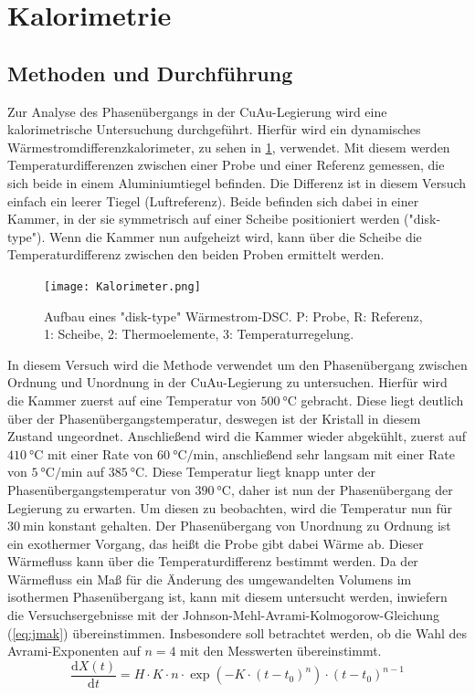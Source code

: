 \documentclass[
	a4paper,
	12pt,
	pagesize,
	ngerman
]{scrartcl}
\begin{document}
\section{Kalorimetrie}
\subsection{Methoden und Durchführung}
Zur Analyse des Phasenübergangs in der CuAu-Legierung wird eine kalorimetrische Untersuchung durchgeführt. Hierfür wird ein dynamisches Wärmestromdifferenzkalorimeter, zu sehen in \cref{kalori}, verwendet. Mit diesem werden Temperaturdifferenzen zwischen einer Probe und einer Referenz gemessen, die sich beide in einem Aluminiumtiegel befinden. Die Differenz ist in diesem Versuch einfach ein leerer Tiegel (Luftreferenz). Beide befinden sich dabei in einer Kammer, in der sie symmetrisch auf einer Scheibe positioniert werden ("disk-type"). Wenn die Kammer nun aufgeheizt wird, kann über die Scheibe die Temperaturdifferenz zwischen den beiden Proben ermittelt werden.

\begin{figure}[h]
	\centering
	\texttt{[image: Kalorimeter.png]}
	\caption{Aufbau eines "disk-type" Wärmestrom-DSC. P: Probe, R: Referenz, 1: Scheibe,
		2: Thermoelemente, 3: Temperaturregelung.}
	\label{kalori}
\end{figure}

In diesem Versuch wird die Methode verwendet um den Phasenübergang zwischen Ordnung und Unordnung in der CuAu-Legierung zu untersuchen. Hierfür wird die Kammer zuerst auf eine Temperatur von $\SI{500}{\degreeCelsius}$ gebracht. Diese liegt deutlich über der Phasenübergangstemperatur, deswegen ist der Kristall in diesem Zustand ungeordnet. Anschließend wird die Kammer wieder abgekühlt, zuerst auf $\SI{410}{\degreeCelsius}$ mit einer Rate von $\SI{60}{\degreeCelsius/\minute}$, anschließend sehr langsam mit einer Rate von $\SI{5}{\degreeCelsius/\minute}$ auf $\SI{385}{\degreeCelsius}$. Diese Temperatur liegt knapp unter der Phasenübergangstemperatur von $\SI{390}{\degreeCelsius}$, daher ist nun der Phasenübergang der Legierung zu erwarten. Um diesen zu beobachten, wird die Temperatur nun für $\SI{30}{\minute}$ konstant gehalten. Der Phasenübergang von Unordnung zu Ordnung ist ein exothermer Vorgang, das heißt die Probe gibt dabei Wärme ab. Dieser Wärmefluss kann über die Temperaturdifferenz bestimmt werden. Da der Wärmefluss ein Maß für die Änderung des umgewandelten Volumens im isothermen Phasenübergang ist, kann mit diesem untersucht werden, inwiefern die Versuchsergebnisse mit der Johnson-Mehl-Avrami-Kolmogorow-Gleichung (\cref{eq:jmak}) übereinstimmen. Insbesondere soll betrachtet werden, ob die Wahl des Avrami-Exponenten auf $n=4$ mit den Messwerten übereinstimmt.
\begin{equation}
	\frac{\mathrm{d}X(t)}{\mathrm{d}t} = H \cdot K \cdot n \cdot \exp(-K\cdot (t-t_0)^n)\cdot (t-t_0)^{n-1}
	\label{eq:jmak}
\end{equation}
\end{document}

